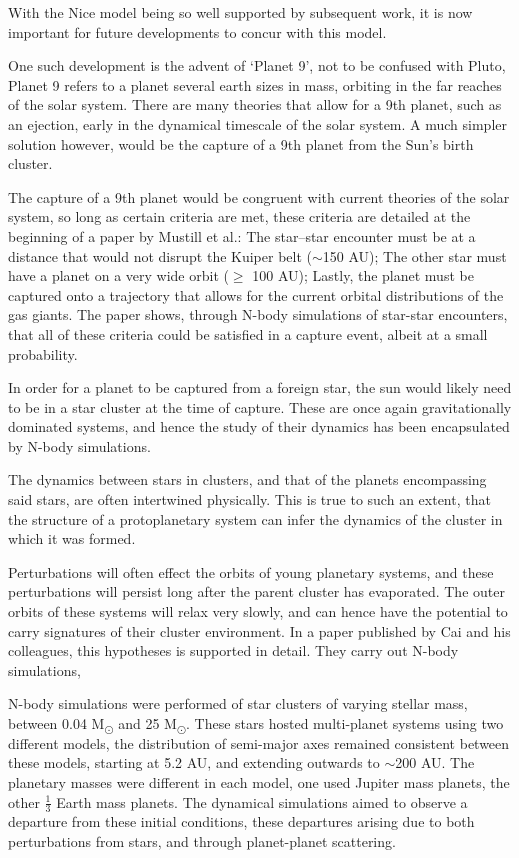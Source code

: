 \documentclass[a4paper,10pt]{article}
\begin{document}
With the Nice model being so well supported by subsequent work, it is now important for future developments to concur with this model. 

One such development is the advent of `Planet 9', not to be confused with Pluto, Planet 9 refers to a planet several earth sizes in mass, orbiting in the far reaches of the solar system. There are many theories that allow for a 9th planet, such as an ejection, early in the dynamical timescale of the solar system. A much simpler solution however, would be the capture of a 9th planet from the Sun's birth cluster.  

The capture of a 9th planet would be congruent with current theories of the solar system, so long as certain criteria are met, these criteria are detailed at the beginning of a paper by Mustill et al.\cite{Planet 9}: The star--star encounter must be at a distance that would not disrupt the Kuiper belt ($\sim$150 AU); The other star must have a planet on a very wide orbit ($\geq$ 100 AU); Lastly, the planet must be captured onto a trajectory that allows for the current orbital distributions of the gas giants. The paper shows, through N-body simulations of star-star encounters, that all of these criteria could be satisfied in a capture event, albeit at a small probability. 

In order for a planet to be captured from a foreign star, the sun would likely need to be in a star cluster at the time of capture. These are once again gravitationally dominated systems, and hence the study of their dynamics has been encapsulated by N-body simulations.

The dynamics between stars in clusters, and that of the planets encompassing said stars, are often intertwined physically. This is true to such an extent, that the structure of a protoplanetary system can infer the dynamics of the cluster in which it was formed. 

Perturbations will often effect the orbits of young planetary systems, and these perturbations will persist long after the parent cluster has evaporated. The outer orbits of these systems will relax very slowly, and can hence have the potential to carry signatures of their cluster environment. In a paper published by Cai and his colleagues, this hypotheses is supported in detail\cite{Signatures}. They carry out N-body simulations, 

N-body simulations were performed of star clusters of varying stellar mass, between 0.04 M\textsubscript{\(\odot\)} and 25 M\textsubscript{\(\odot\)}. These stars hosted multi-planet systems using two different models, the distribution of semi-major axes remained consistent between these models, starting at 5.2 AU, and extending outwards to $\sim$200 AU. The planetary masses were different in each model, one used Jupiter mass planets, the other $\frac{1}{3}$ Earth mass planets. The dynamical simulations aimed to observe a departure from these initial conditions, these departures arising due to both perturbations from stars, and through planet-planet scattering.
\end{document}
